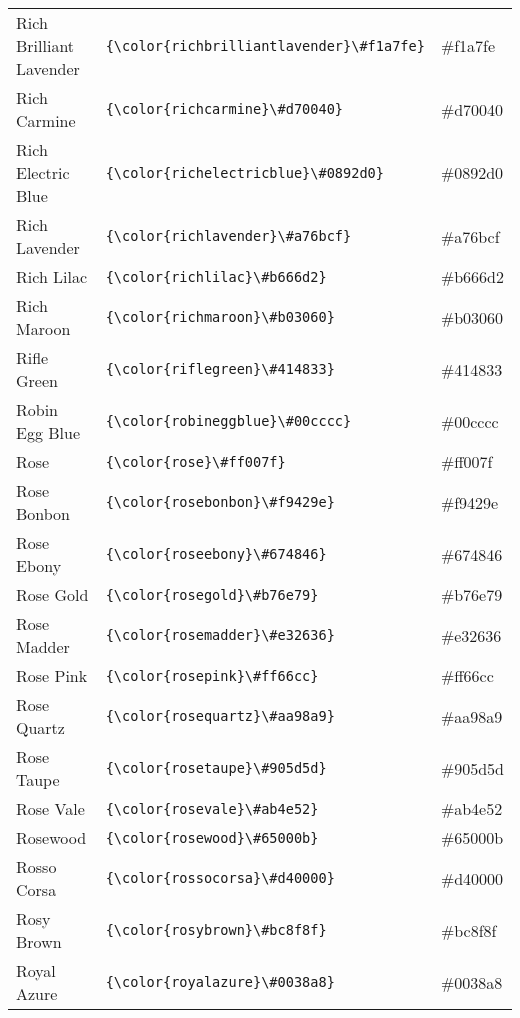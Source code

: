 \documentclass[9.5pt]{article}
\begin{document}
\begin{longtable}{l | l | l}
	Rich Brilliant Lavender & \verb!{\color{richbrilliantlavender}\#f1a7fe}! & {\color{richbrilliantlavender}\#f1a7fe}\\
	Rich Carmine & \verb!{\color{richcarmine}\#d70040}! & {\color{richcarmine}\#d70040}\\
	Rich Electric Blue & \verb!{\color{richelectricblue}\#0892d0}! & {\color{richelectricblue}\#0892d0}\\
	Rich Lavender & \verb!{\color{richlavender}\#a76bcf}! & {\color{richlavender}\#a76bcf}\\
	Rich Lilac & \verb!{\color{richlilac}\#b666d2}! & {\color{richlilac}\#b666d2}\\
	Rich Maroon & \verb!{\color{richmaroon}\#b03060}! & {\color{richmaroon}\#b03060}\\
	Rifle Green & \verb!{\color{riflegreen}\#414833}! & {\color{riflegreen}\#414833}\\
	Robin Egg Blue & \verb!{\color{robineggblue}\#00cccc}! & {\color{robineggblue}\#00cccc}\\
	Rose & \verb!{\color{rose}\#ff007f}! & {\color{rose}\#ff007f}\\
	Rose Bonbon & \verb!{\color{rosebonbon}\#f9429e}! & {\color{rosebonbon}\#f9429e}\\
	Rose Ebony & \verb!{\color{roseebony}\#674846}! & {\color{roseebony}\#674846}\\
	Rose Gold & \verb!{\color{rosegold}\#b76e79}! & {\color{rosegold}\#b76e79}\\
	Rose Madder & \verb!{\color{rosemadder}\#e32636}! & {\color{rosemadder}\#e32636}\\
	Rose Pink & \verb!{\color{rosepink}\#ff66cc}! & {\color{rosepink}\#ff66cc}\\
	Rose Quartz & \verb!{\color{rosequartz}\#aa98a9}! & {\color{rosequartz}\#aa98a9}\\
	Rose Taupe & \verb!{\color{rosetaupe}\#905d5d}! & {\color{rosetaupe}\#905d5d}\\
	Rose Vale & \verb!{\color{rosevale}\#ab4e52}! & {\color{rosevale}\#ab4e52}\\
	Rosewood & \verb!{\color{rosewood}\#65000b}! & {\color{rosewood}\#65000b}\\
	Rosso Corsa & \verb!{\color{rossocorsa}\#d40000}! & {\color{rossocorsa}\#d40000}\\
	Rosy Brown & \verb!{\color{rosybrown}\#bc8f8f}! & {\color{rosybrown}\#bc8f8f}\\
	Royal Azure & \verb!{\color{royalazure}\#0038a8}! & {\color{royalazure}\#0038a8}\\

\end{longtable}
\end{document}
